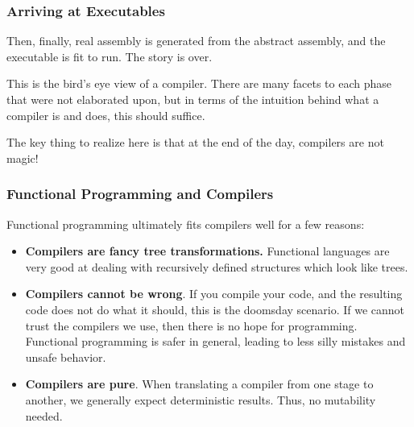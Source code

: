 \documentclass[aspectratio=169]{beamer}
\begin{document}
\begin{frame}[fragile]
  \frametitle{Arriving at Executables}

  Then, finally, real assembly is generated from the abstract assembly, and
  the executable is fit to run. The story is over.

  \pause
  \vspace{\fill}

  This is the bird's eye view of a compiler. There are many facets to each
  phase that were not elaborated upon, but in terms of the intuition behind
  what a compiler is and does, this should suffice.

  \pause
  \vspace{\fill}

  The key thing to realize here is that at the end of the day, compilers are
  not magic!
\end{frame}

\begin{frame}[fragile]
  \frametitle{Functional Programming and Compilers}

  Functional programming ultimately fits compilers well for a few reasons:
  \pause
  \begin{itemize}
    \item \textbf{Compilers are fancy tree transformations.} Functional languages
    are very good at dealing with recursively defined structures which look like
    trees. \pause
    \item \textbf{Compilers cannot be wrong}. If you compile your code, and the
    resulting code does not do what it should, this is the doomsday scenario. If
    we cannot trust the compilers we use, then there is no hope for programming.
    Functional programming is safer in general, leading to less silly mistakes and
    unsafe behavior. \pause
    \item \textbf{Compilers are pure}. When translating a compiler from one
    stage to another, we generally expect deterministic results. Thus, no
    mutability needed.
  \end{itemize}
\end{frame}

\end{document}
